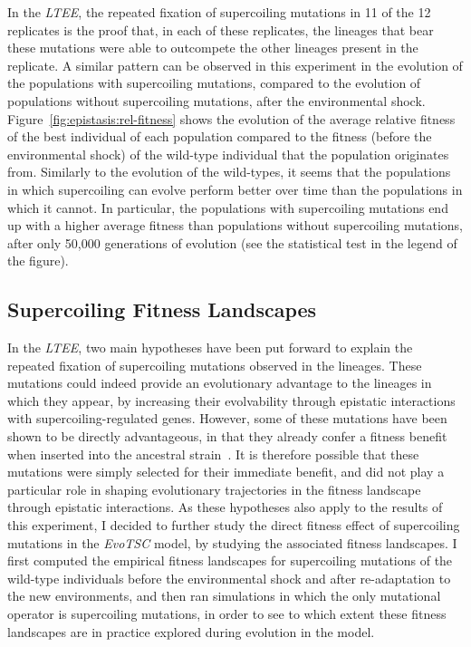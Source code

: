 In the \emph{LTEE}, the repeated fixation of supercoiling mutations in 11 of the 12 replicates is the proof that, in each of these replicates, the lineages that bear these mutations were able to outcompete the other lineages present in the replicate.
A similar pattern can be observed in this experiment in the evolution of the populations with supercoiling mutations, compared to the evolution of populations without supercoiling mutations, after the environmental shock.
Figure~\ref{fig:epistasis:rel-fitness} shows the evolution of the average relative fitness of the best individual of each population compared to the fitness (before the environmental shock) of the wild-type individual that the population originates from.
Similarly to the evolution of the wild-types, it seems that the populations in which supercoiling can evolve perform better over time than the populations in which it cannot.
In particular, the populations with supercoiling mutations end up with a higher average fitness than populations without supercoiling mutations, after only 50,000 generations of evolution (see the statistical test in the legend of the figure).

\subsection{Supercoiling Fitness Landscapes}

In the \emph{LTEE}, two main hypotheses have been put forward to explain the repeated fixation of supercoiling mutations observed in the lineages.
These mutations could indeed provide an evolutionary advantage to the lineages in which they appear, by increasing their evolvability through epistatic interactions with supercoiling-regulated genes.
However, some of these mutations have been shown to be directly advantageous, in that they already confer a fitness benefit when inserted into the ancestral strain~\citep{crozat2005}.
It is therefore possible that these mutations were simply selected for their immediate benefit, and did not play a particular role in shaping evolutionary trajectories in the fitness landscape through epistatic interactions.
As these hypotheses also apply to the results of this experiment, I decided to further study the direct fitness effect of supercoiling mutations in the \emph{EvoTSC} model, by studying the associated fitness landscapes.
I first computed the empirical fitness landscapes for supercoiling mutations of the wild-type individuals before the environmental shock and after re-adaptation to the new environments, and then ran simulations in which the only mutational operator is supercoiling mutations, in order to see to which extent these fitness landscapes are in practice explored during evolution in the model.

